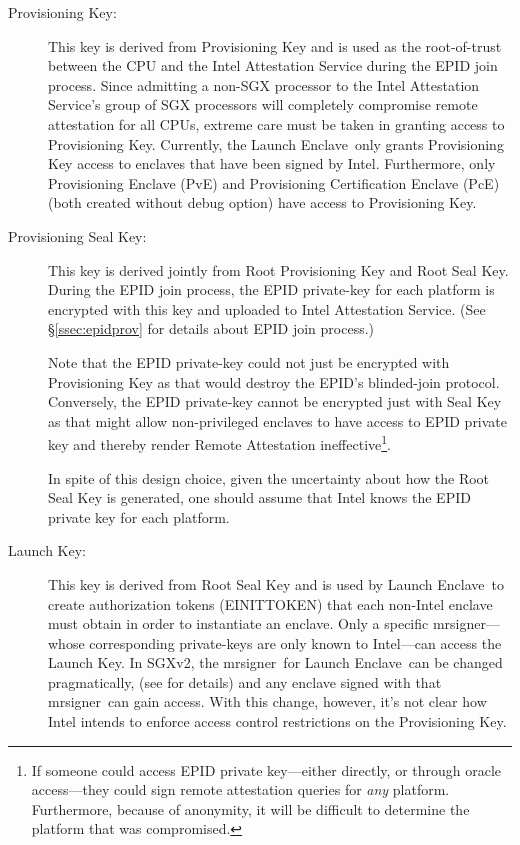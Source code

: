 \documentclass[10pt, letterpaper]{article}
\newcommand{\secref}[1]{\S\ref{#1}}
\newcommand{\mrsigner}{\textsf{mrsigner}}
\newcommand{\pve}{\textsf{PvE}}
\newcommand{\pce}{\textsf{PcE}}
\newcommand{\launchenclave}{\textsf{Launch Enclave}}
\begin{document}
  \begin{description}
  \item[Provisioning Key:] This key is derived from Provisioning Key
    and is used as the root-of-trust between the CPU and the Intel
    Attestation Service during the EPID join process. Since admitting
    a non-SGX processor to the Intel Attestation Service's group of SGX
    processors will completely compromise remote attestation for all
    CPUs, extreme care must be taken in granting access to
    Provisioning Key. Currently, the \launchenclave\ only grants
    Provisioning Key access to enclaves that have been signed by
    Intel. Furthermore, only Provisioning Enclave (\pve) and
    Provisioning Certification Enclave (\pce) (both created without
    debug option) have access to Provisioning Key.

  \item[Provisioning Seal Key:] This key is derived jointly from Root
    Provisioning Key and Root Seal Key. During the EPID join process,
    the EPID private-key for each platform is encrypted with this key
    and uploaded to Intel Attestation Service. (See
    \secref{ssec:epidprov} for details about EPID join process.)

    Note that the EPID private-key could not just be encrypted with
    Provisioning Key as that would destroy the EPID's blinded-join
    protocol. Conversely, the EPID private-key cannot be encrypted
    just with Seal Key as that might allow non-privileged enclaves to
    have access to EPID private key and thereby render Remote
    Attestation ineffective\footnote{If someone could access EPID
      private key---either directly, or through oracle access---they
      could sign remote attestation queries for \textit{any}
      platform. Furthermore, because of anonymity, it will be
      difficult to determine the platform that was compromised.}.

    In spite of this design choice, given the uncertainty about how
    the Root Seal Key is generated, one should assume that Intel knows
    the EPID private key for each platform.

  \item[Launch Key:] This key is derived from Root Seal Key and is
    used by \launchenclave\ to create authorization tokens
    (\textsf{EINITTOKEN}) that each non-Intel enclave must obtain in
    order to instantiate an enclave. Only a specific \mrsigner---whose
    corresponding private-keys are only known to Intel---can access
    the Launch Key. In SGXv2, the \mrsigner\ for \launchenclave\ can
    be changed pragmatically, (see \cite[\S39.1.4]{intelsdm} for
    details) and any enclave signed with that \mrsigner\ can gain
    access. With this change, however, it's not clear how Intel
    intends to enforce access control restrictions on the
    Provisioning Key.


\end{description}
\end{document}
